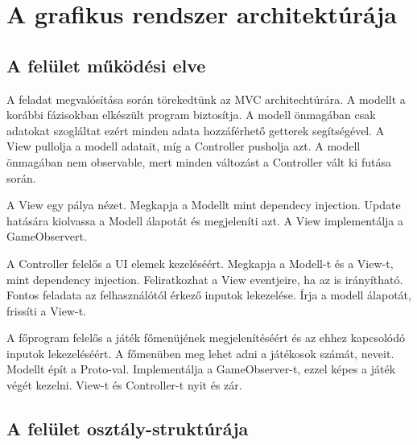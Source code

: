 \section{A grafikus rendszer architektúrája}

\subsection{A felület működési elve}

A feladat megvalósítása során törekedtünk az MVC architechtúrára. A modellt a korábbi fázisokban elkészült program biztosítja. A modell önmagában csak adatokat szogláltat ezért minden adata hozzáférhető getterek segítségével. A View pullolja a modell adatait, míg a Controller pusholja azt. A modell önmagában nem observable, mert minden változást a Controller vált ki futása során.

A View egy pálya nézet. Megkapja a Modellt mint dependecy injection. Update hatására kiolvassa a Modell álapotát és megjeleníti azt. A View implementálja a GameObservert.

A Controller felelős a UI elemek kezeléséért. Megkapja a Modell-t és a View-t, mint dependency injection. Feliratkozhat a View eventjeire, ha az is irányítható. Fontos feladata az felhasználótól érkező inputok lekezelése. Írja a modell álapotát, frissíti a View-t.

A főprogram felelős a játék főmenüjének megjelenítéséért és az ehhez kapcsolódó inputok lekezeléséért. A főmenüben meg lehet adni a játékosok számát, neveit. Modellt épít a Proto-val. Implementálja a GameObserver-t, ezzel képes a játék végét kezelni. View-t és Controller-t nyit és zár.
\subsection{A felület osztály-struktúrája}

